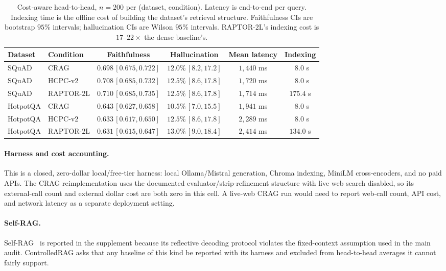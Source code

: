 \begin{table}[!htb]
\centering
\caption{Cost-aware head-to-head, $n=200$ per (dataset, condition).
Latency is end-to-end per query. Indexing time is the offline cost of
building the dataset's retrieval structure. Faithfulness CIs are
bootstrap $95\%$ intervals; hallucination CIs are Wilson $95\%$
intervals. RAPTOR-$2$L's indexing cost is $17$--$22\times$ the dense
baseline's.}
\label{tab:cost_main}
\scriptsize
\begin{tabular}{llcccc}
\toprule
Dataset & Condition & Faithfulness & Hallucination & Mean latency & Indexing \\
\midrule
SQuAD    & CRAG        & $0.698\,[0.675,0.722]$ & $12.0\%\,[8.2,17.2]$ & $1{,}440$ ms & $\phantom{1}8.0$ s \\
SQuAD    & HCPC-v$2$   & $0.708\,[0.685,0.732]$ & $12.5\%\,[8.6,17.8]$ & $1{,}720$ ms & $\phantom{1}8.0$ s \\
SQuAD    & RAPTOR-$2$L & $0.710\,[0.685,0.735]$ & $12.5\%\,[8.6,17.8]$ & $1{,}714$ ms & $175.4$ s \\
HotpotQA & CRAG        & $0.643\,[0.627,0.658]$ & $10.5\%\,[7.0,15.5]$ & $1{,}941$ ms & $\phantom{1}8.0$ s \\
HotpotQA & HCPC-v$2$   & $0.633\,[0.617,0.650]$ & $12.5\%\,[8.6,17.8]$ & $2{,}289$ ms & $\phantom{1}8.0$ s \\
HotpotQA & RAPTOR-$2$L & $0.631\,[0.615,0.647]$ & $13.0\%\,[9.0,18.4]$ & $2{,}414$ ms & $134.0$ s \\
\bottomrule
\end{tabular}
\end{table}

\paragraph{Harness and cost accounting.} This is a closed, zero-dollar
local/free-tier harness: local Ollama/Mistral generation, Chroma
indexing, MiniLM cross-encoders, and no paid APIs. The CRAG
reimplementation uses the documented evaluator/strip-refinement
structure with live web search disabled, so its external-call count and
external dollar cost are both zero in this cell. A live-web CRAG run
would need to report web-call count, API cost, and network latency as a
separate deployment setting.

\paragraph{Self-RAG.} Self-RAG~\citep{asai2024selfrag} is reported in
the supplement because its reflective decoding protocol violates the
fixed-context assumption used in the main audit. ControlledRAG asks
that any baseline of this kind be reported with its harness and
excluded from head-to-head averages it cannot fairly support.

